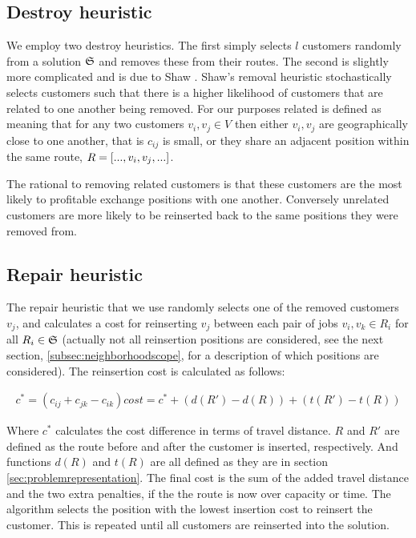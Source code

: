\subsection{Destroy heuristic}
\label{subsec:destroyheuristic}

We employ two destroy heuristics. The first simply selects $l$ customers randomly from a solution $\mathfrak{S}$ and removes these from their routes. The second is slightly more complicated and is due to Shaw \cite{Shaw:1998}. Shaw's removal heuristic stochastically selects customers such that there is a higher likelihood of customers that are related to one another being removed. For our purposes related is defined as meaning that for any two customers $v_i, v_j \in V$ then either $v_i, v_j$ are geographically close to one another, that is $c_{ij}$ is small, or they share an adjacent position within the same route, $R = [..., v_i, v_j, ...]$.

The rational to removing related customers is that these customers are the most likely to profitable exchange positions with one another. Conversely unrelated customers are more likely to be reinserted back to the same positions they were removed from. 

\subsection{Repair heuristic}
\label{subsec:repairheuristic}

The repair heuristic that we use randomly selects one of the removed customers $v_j$, and calculates a cost for reinserting $v_j$ between each pair of jobs $v_i, v_k \in R_i$ for all $R_i \in \mathfrak{S}$ (actually not all reinsertion positions are considered, see the next section, \ref{subsec:neighborhoodscope}, for a description of which positions are considered). The reinsertion cost is calculated as follows:

\begin{align}
   c^* = (c_{ij} + c_{jk} - c_{ik}) 
   cost = c^* + (d(R') - d(R)) + (t(R') - t(R))
\end{align}

Where $c^*$ calculates the cost difference in terms of travel distance. $R$ and $R'$ are defined as the route before and after the customer is inserted, respectively. And functions $d(R)$ and $t(R)$ are all defined as they are in section \ref{sec:problemrepresentation}. The final cost is the sum of the added travel distance and the two extra penalties, if the the route is now over capacity or time. The algorithm selects the position with the lowest insertion cost to reinsert the customer. This is repeated until all customers are reinserted into the solution. 

